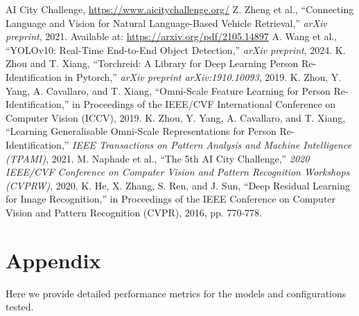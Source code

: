 \documentclass[11pt]{IEEEtran}
\begin{document}

\begin{thebibliography}{9}
     AI City Challenge, \url{https://www.aicitychallenge.org/}
     Z. Zheng et al., ``Connecting Language and Vision for
    Natural Language-Based Vehicle Retrieval,'' \emph{arXiv preprint}, 2021.
    Available at: \url{https://arxiv.org/pdf/2105.14897}
     A. Wang et al., ``YOLOv10: Real-Time End-to-End
    Object Detection,'' \emph{arXiv preprint}, 2024.
     K. Zhou and T. Xiang, ``Torchreid: A Library for Deep
    Learning Person Re-Identification in Pytorch,'' \emph{arXiv preprint
        arXiv:1910.10093}, 2019.
     K. Zhou, Y. Yang, A. Cavallaro, and T. Xiang,
    ``Omni-Scale Feature Learning for Person Re-Identification,'' in Proceedings of
    the IEEE/CVF International Conference on Computer Vision (ICCV), 2019.
     K. Zhou, Y. Yang, A. Cavallaro, and T. Xiang,
    ``Learning Generalisable Omni-Scale Representations for Person
    Re-Identification,'' \emph{IEEE Transactions on Pattern Analysis and Machine
        Intelligence (TPAMI)}, 2021.
     M. Naphade et al., ``The 5th AI City Challenge,''
    \emph{2020 IEEE/CVF Conference on Computer Vision and Pattern Recognition
        Workshops (CVPRW)}, 2020.
     K. He, X. Zhang, S. Ren, and J. Sun, ``Deep Residual
    Learning for Image Recognition,'' in Proceedings of the IEEE Conference on
    Computer Vision and Pattern Recognition (CVPR), 2016, pp. 770-778.
\end{thebibliography}

\appendix
\section{Appendix}
Here we provide detailed performance metrics for the models and configurations
tested.
\end{document}
